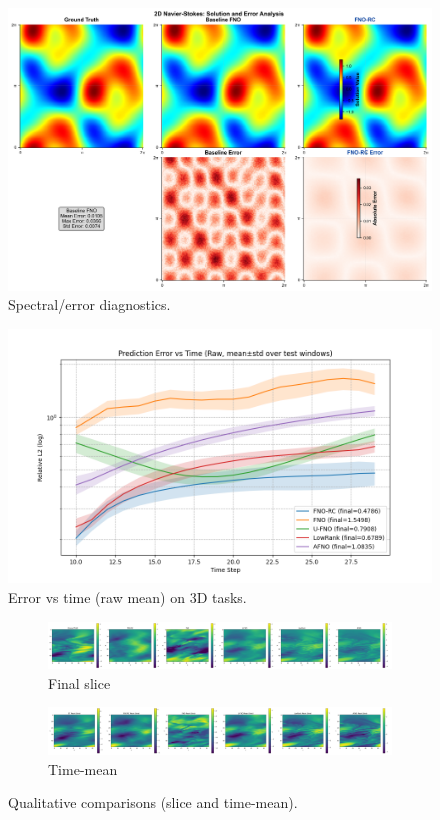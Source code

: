 \documentclass[11pt]{article}
\begin{document}
\begin{figure}[t]
  \centering
  \includegraphics[width=.95\linewidth]{figures/error_analysis.png}
  \caption{Spectral/error diagnostics.}
  \label{fig:spectrum}
\end{figure}

\begin{figure}[t]
  \centering
  \includegraphics[width=.95\linewidth]{../实验图/error_vs_time_raw_mean.png}
  \caption{Error vs time (raw mean) on 3D tasks.}
  \label{fig:error_time_raw}
\end{figure}

\begin{figure}[t]
  \centering
  \begin{subfigure}{.49\linewidth}
    \centering
    \includegraphics[width=\linewidth]{../实验图/final_slice.png}
    \caption{Final slice}
  \end{subfigure}
  \begin{subfigure}{.49\linewidth}
    \centering
    \includegraphics[width=\linewidth]{../实验图/mean_time.png}
    \caption{Time-mean}
  \end{subfigure}
  \caption{Qualitative comparisons (slice and time-mean).}
  \label{fig:qualitative}
\end{figure}



\end{document}
